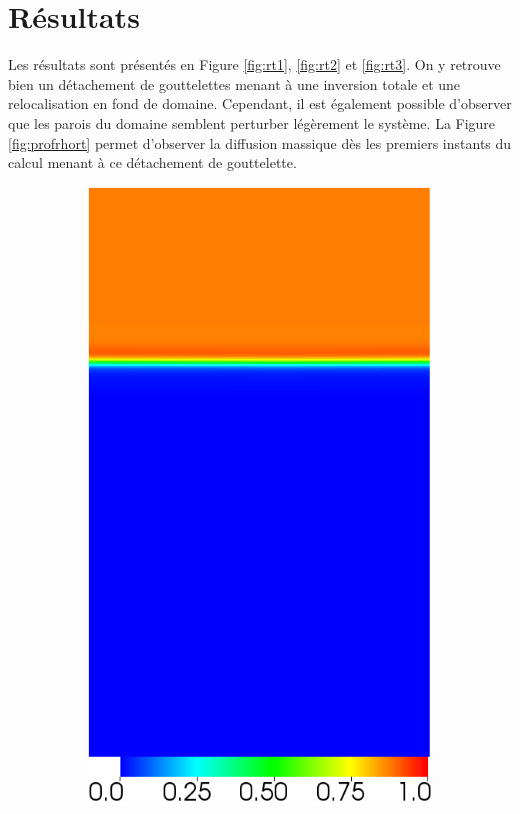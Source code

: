 \section{Résultats}
Les résultats sont présentés en Figure \ref{fig:rt1}, \ref{fig:rt2} et \ref{fig:rt3}. On y retrouve bien un détachement de gouttelettes menant à une inversion totale et une relocalisation en fond de domaine. Cependant, il est également possible d'observer que les parois du domaine semblent perturber légèrement le système. La Figure \ref{fig:profrhort} permet d'observer la diffusion massique dès les premiers instants du calcul menant à ce détachement de gouttelette.
\begin{figure}[H]
	\centering
	\begin{subfigure}[ht!]{0.2\textwidth}
		\centering
		\includegraphics[width=1\textwidth]{figure/PT_RT/concent1/visit0000.png}

\end{subfigure}
\end{figure}
